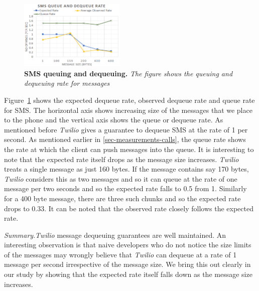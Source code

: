 \begin{figure} \centering
\includegraphics[width=0.45\textwidth]{graphs/sms.pdf}
\caption{\textbf{SMS queuing and dequeuing.} {\footnotesize\textit{
The figure shows the queuing and dequeuing rate for messages
}}}
\label{fig:sms}
\end{figure}

Figure~\ref{fig:sms} shows the expected dequeue rate, observed dequeue rate and queue rate for SMS. The horizontal axis shows increasing size of the messages that we place to the phone and the vertical axis shows the queue or dequeue rate. As mentioned before \textit{Twilio} gives a guarantee to dequeue SMS at the rate of 1 per second. As mentioned earlier in \ref{sec-measurements-calls}, the queue rate shows the rate at which the client can push messages into the queue. It is interesting to note that the expected rate itself drops as the message size increases. \textit{Twilio} treats a single message as just 160 bytes. If the message contains say 170 bytes, \textit{Twilio} considers this as two messages and so it can queue at the rate of one message per two seconds and so the expected rate falls to 0.5 from 1. Similarly for a 400 byte message, there are three such chunks and so the expected rate drops to 0.33. It can be noted that the observed rate closely follows the expected rate. 

\textit{Summary}.\textit{Twilio} message dequeuing guarantees are well maintained. An interesting observation is that naive developers who do not notice the size limits of the messages may wrongly believe that \textit{Twilio} can dequeue at a rate of 1 message per second irrespective of the message size. We bring this out clearly in our study by showing that the expected rate itself falls down as the message size increases. 




